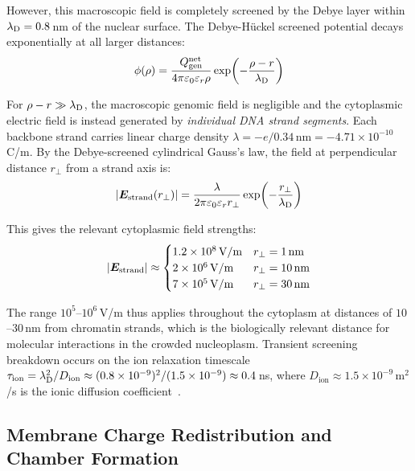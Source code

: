 However, this macroscopic field is completely screened by the Debye layer within $\lambda_{\mathrm{D}} = 0.8$\,nm of the nuclear surface. The Debye-H\"{u}ckel screened potential decays exponentially at all larger distances:
\begin{equation}
  \phi(\rho) = \frac{Q_{\mathrm{gen}}^{\mathrm{net}}}{4\pi \varepsilon_{0} \varepsilon_r \rho} \exp\!\left(-\frac{\rho - r}{\lambda_{\mathrm{D}}}\right)
  \label{v:eq:screened_potential}
\end{equation}

For $\rho - r \gg \lambda_{\mathrm{D}}$, the macroscopic genomic field is negligible and the cytoplasmic electric field is instead generated by \emph{individual DNA strand segments}. Each backbone strand carries linear charge density $\lambda = -e/0.34\,\mathrm{nm} = -4.71 \times 10^{-10}$\,C/m. By the Debye-screened cylindrical Gauss's law, the field at perpendicular distance $r_\perp$ from a strand axis is:
\begin{equation}
  \abs{\boldsymbol{E}_{\mathrm{strand}}(r_\perp)} = \frac{\lambda}{2\pi \varepsilon_{0} \varepsilon_r r_\perp} \exp\!\left(-\frac{r_\perp}{\lambda_{\mathrm{D}}}\right)
  \label{v:eq:strand_field}
\end{equation}

This gives the relevant cytoplasmic field strengths:
\begin{equation}
  \abs{\boldsymbol{E}_{\mathrm{strand}}} \approx
  \begin{cases}
    1.2 \times 10^8\,\mathrm{V/m} & r_\perp = 1\,\mathrm{nm} \\
    2 \times 10^6\,\mathrm{V/m}   & r_\perp = 10\,\mathrm{nm} \\
    7 \times 10^5\,\mathrm{V/m}   & r_\perp = 30\,\mathrm{nm}
  \end{cases}
\end{equation}

The range $10^5$--$10^6$\,V/m thus applies throughout the cytoplasm at distances of $10$--$30$\,nm from chromatin strands, which is the biologically relevant distance for molecular interactions in the crowded nucleoplasm. Transient screening breakdown occurs on the ion relaxation timescale $\tau_{\mathrm{ion}} = \lambda_{\mathrm{D}}^2 / D_{\mathrm{ion}} \approx (0.8 \times 10^{-9})^2 / (1.5 \times 10^{-9}) \approx 0.4$\,ns, where $D_{\mathrm{ion}} \approx 1.5 \times 10^{-9}$\,m$^2$/s is the ionic diffusion coefficient~\cite{Hille2001}.

\subsection{Membrane Charge Redistribution and Chamber Formation}

